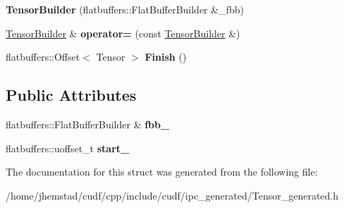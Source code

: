 \begin{DoxyCompactItemize}
\item 
{\bfseries Tensor\+Builder} (flatbuffers\+::\+Flat\+Buffer\+Builder \&\+\_\+fbb)\hypertarget{structorg_1_1apache_1_1arrow_1_1flatbuf_1_1TensorBuilder_a568f467d93d8822afee7f89f7704c18e}{}\label{structorg_1_1apache_1_1arrow_1_1flatbuf_1_1TensorBuilder_a568f467d93d8822afee7f89f7704c18e}

\item 
\hyperlink{structorg_1_1apache_1_1arrow_1_1flatbuf_1_1TensorBuilder}{Tensor\+Builder} \& {\bfseries operator=} (const \hyperlink{structorg_1_1apache_1_1arrow_1_1flatbuf_1_1TensorBuilder}{Tensor\+Builder} \&)\hypertarget{structorg_1_1apache_1_1arrow_1_1flatbuf_1_1TensorBuilder_a44374abac61652e9be7a276c59f84565}{}\label{structorg_1_1apache_1_1arrow_1_1flatbuf_1_1TensorBuilder_a44374abac61652e9be7a276c59f84565}

\item 
flatbuffers\+::\+Offset$<$ Tensor $>$ {\bfseries Finish} ()\hypertarget{structorg_1_1apache_1_1arrow_1_1flatbuf_1_1TensorBuilder_aa5d0efb41d21dfd3c28bda3fddf4d32b}{}\label{structorg_1_1apache_1_1arrow_1_1flatbuf_1_1TensorBuilder_aa5d0efb41d21dfd3c28bda3fddf4d32b}

\end{DoxyCompactItemize}
\subsection*{Public Attributes}
\begin{DoxyCompactItemize}
\item 
flatbuffers\+::\+Flat\+Buffer\+Builder \& {\bfseries fbb\+\_\+}\hypertarget{structorg_1_1apache_1_1arrow_1_1flatbuf_1_1TensorBuilder_a6f8e8b2f0b2d37dc3f87784bf34ab925}{}\label{structorg_1_1apache_1_1arrow_1_1flatbuf_1_1TensorBuilder_a6f8e8b2f0b2d37dc3f87784bf34ab925}

\item 
flatbuffers\+::uoffset\+\_\+t {\bfseries start\+\_\+}\hypertarget{structorg_1_1apache_1_1arrow_1_1flatbuf_1_1TensorBuilder_aef522b1fc72a0679eb0d8c9a9f5c14f3}{}\label{structorg_1_1apache_1_1arrow_1_1flatbuf_1_1TensorBuilder_aef522b1fc72a0679eb0d8c9a9f5c14f3}

\end{DoxyCompactItemize}


The documentation for this struct was generated from the following file\+:\begin{DoxyCompactItemize}
\item 
/home/jhemstad/cudf/cpp/include/cudf/ipc\+\_\+generated/Tensor\+\_\+generated.\+h\end{DoxyCompactItemize}
